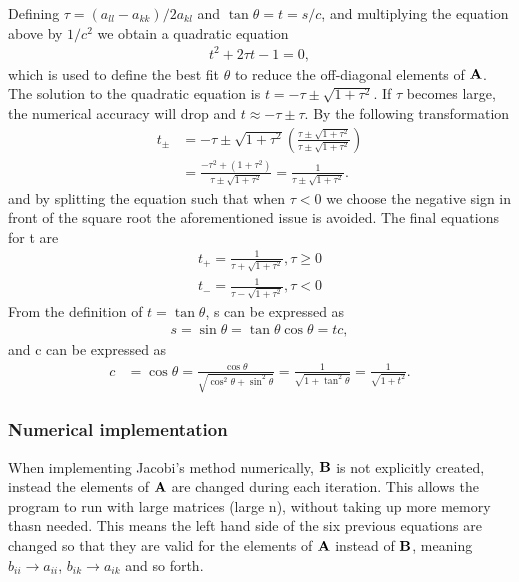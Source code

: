 \documentclass{emulateapj}
\begin{document}
%
Defining $\tau = \left(a_{ll} - a_{kk}\right)/2a_{kl}$ and $\tan\theta = t = s/c$, and multiplying the equation above by $1/c^2$ we obtain a quadratic equation 
%
\begin{gather*}
    t^2 + 2\tau t - 1 = 0,
\end{gather*}
%
which is used to define the best fit $\theta$ to reduce the off-diagonal elements of $\bold{A}$. The solution to the quadratic equation is $t = -\tau \pm \sqrt{1 + \tau^2}$. If $\tau$ becomes large, the numerical accuracy will drop and $t \approx -\tau \pm \tau$. By the following transformation
%
\begin{align*}
    t_{\pm} &= -\tau \pm \sqrt{1+\tau^2}\left(\frac{\tau \pm \sqrt{1+\tau^2}}{\tau \pm \sqrt{1+\tau^2}}\right) \\
    &= \frac{-\tau^2 + \left(1 + \tau^2\right)}{\tau \pm \sqrt{1 + \tau^2}} = \frac{1}{\tau \pm \sqrt{1+\tau^2}}.
\end{align*}
%
and by splitting the equation such that when $\tau < 0$ we choose the negative sign in front of the square root the aforementioned issue is avoided. The final equations for t are
%
\begin{align*}
    t_+ = \frac{1}{\tau + \sqrt{1 + \tau^2}}, \tau \geq 0 \\
    t_- = \frac{1}{\tau - \sqrt{1 + \tau^2}}, \tau < 0
\end{align*}
%
From the definition of $t = \tan\theta$, s can be expressed as
%
\begin{align*}
    s = \sin\theta = \tan\theta \cos\theta = tc,
\end{align*}
and c can be expressed as
\begin{align*}
    c &= \cos\theta = \frac{\cos\theta}{\sqrt{\cos^2\theta + \sin^2\theta}} = \frac{1}{\sqrt{1 + \tan^2\theta}}  = \frac{1}{\sqrt{1 + t^2}}.
\end{align*}

 
\subsubsection{Numerical implementation}
When implementing Jacobi's method numerically, $\bold{B}$ is not explicitly created, instead the elements of $\bold{A}$ are changed during each iteration. This allows the program to run with large matrices (large n), without taking up more memory thasn needed. This means the left hand side of the six previous equations are changed so that they are valid for the elements of $\bold{A}$ instead of $\bold{B}$, meaning $b_{ii} \rightarrow a_{ii}$, $b_{ik} \rightarrow a_{ik}$ and so forth.
\end{document}
